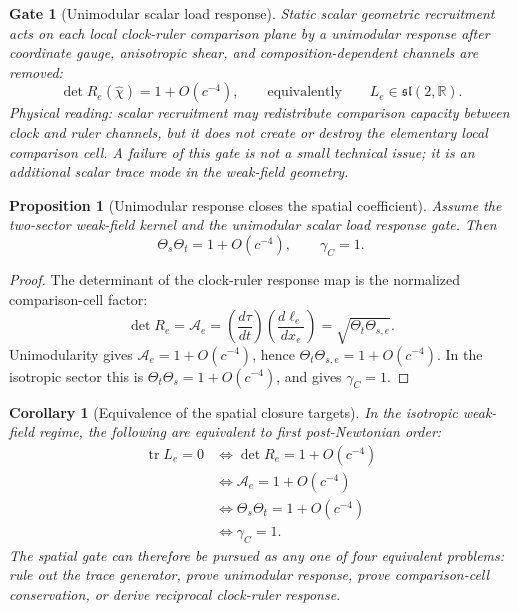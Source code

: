 \documentclass[11pt]{article}
\newtheorem{proposition}[theorem]{Proposition}
\newtheorem{corollary}[theorem]{Corollary}
\newtheorem{gate}[theorem]{Gate}
\theoremstyle{remark}
\begin{document}
\begin{gate}[Unimodular scalar load response]
\label{gate:unimodular-load-response}
Static scalar geometric recruitment acts on each local clock-ruler comparison plane by a unimodular response after coordinate gauge, anisotropic shear, and composition-dependent channels are removed:
\[
        \det R_e(\hat\chi)=1+O(c^{-4}),
        \qquad\text{equivalently}\qquad
        L_e\in\mathfrak{sl}(2,\mathbb R).
\]
Physical reading: scalar recruitment may redistribute comparison capacity between clock and ruler channels, but it does not create or destroy the elementary local comparison cell.  A failure of this gate is not a small technical issue; it is an additional scalar trace mode in the weak-field geometry.
\end{gate}

\begin{proposition}[Unimodular response closes the spatial coefficient]
\label{prop:unimodular-implies-gamma}
Assume the two-sector weak-field kernel and the unimodular scalar load response gate.  Then
\[
        \Theta_s\Theta_t=1+O(c^{-4}),
        \qquad
        \gamma_C=1.
\]
\end{proposition}

\begin{proof}
The determinant of the clock-ruler response map is the normalized comparison-cell factor:
\[
        \det R_e=\mathcal A_e
        =\left(\frac{d\tau}{dt}\right)
         \left(\frac{d\ell_e}{dx_e}\right)
        =\sqrt{\Theta_t\Theta_{s,e}}.
\]
Unimodularity gives \(\mathcal A_e=1+O(c^{-4})\), hence \(\Theta_t\Theta_{s,e}=1+O(c^{-4})\).  In the isotropic sector this is \(\Theta_t\Theta_s=1+O(c^{-4})\), and  gives \(\gamma_C=1\).
\end{proof}

\begin{corollary}[Equivalence of the spatial closure targets]
\label{cor:spatial-target-equivalence}
In the isotropic weak-field regime, the following are equivalent to first post-Newtonian order:
\[
\begin{aligned}
        \operatorname{tr}L_e=0
        &\Longleftrightarrow
        \det R_e=1+O(c^{-4}) \\
        &\Longleftrightarrow
        \mathcal A_e=1+O(c^{-4}) \\
        &\Longleftrightarrow
        \Theta_s\Theta_t=1+O(c^{-4}) \\
        &\Longleftrightarrow
        \gamma_C=1.
\end{aligned}
\]
The spatial gate can therefore be pursued as any one of four equivalent problems: rule out the trace generator, prove unimodular response, prove comparison-cell conservation, or derive reciprocal clock-ruler response.
\end{corollary}
\end{document}

